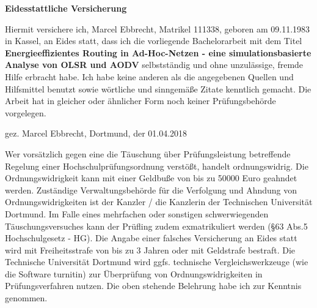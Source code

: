 
\cleardoublepage


\newpage
\noindent\large{\textbf{Eidesstattliche Versicherung}}\newline

\noindent Hiermit versichere ich, Marcel Ebbrecht, Matrikel 111338, geboren am 09.11.1983 in Kassel, an Eides statt, dass ich die vorliegende Bachelorarbeit mit dem Titel \textbf{\glqq Energieeffizientes Routing in Ad-Hoc-Netzen - eine simulationsbasierte Analyse von OLSR und AODV\grqq}  selbstständig und ohne unzulässige, fremde Hilfe erbracht habe. Ich habe keine anderen als die angegebenen Quellen und Hilfsmittel benutzt sowie wörtliche und sinngemäße Zitate kenntlich gemacht. Die Arbeit hat in gleicher oder ähnlicher Form noch keiner Prüfungsbehörde vorgelegen. \newline\newline\newline

\noindent gez. Marcel Ebbrecht, Dortmund, der 01.04.2018\newline\newline\newline

\newline\newline

\noindent Wer vorsätzlich gegen eine die Täuschung über Prüfungsleistung betreffende Regelung einer Hochschulprüfungsordnung verstößt, handelt ordnungswidrig. Die Ordnungswidrigkeit kann mit einer Geldbuße von bis zu 50000 Euro geahndet werden. Zuständige Verwaltungsbehörde für die Verfolgung und Ahndung von Ordnungswidrigkeiten ist der Kanzler / die Kanzlerin der Technischen Universität Dortmund. Im Falle eines mehrfachen oder sonstigen schwerwiegenden Täuschungsversuches kann der Prüfling zudem exmatrikuliert werden (§63 Abs.5 Hochschulgesetz - HG). Die Angabe einer falsches Versicherung an Eides statt wird mit Freiheitsstrafe von bis zu 3 Jahren oder mit Geldstrafe bestraft. Die Technische Universität Dortmund wird ggfs. technische Vergleichswerkzeuge (wie \zB die Software \glqq turnitin\grqq) zur Überprüfung von Ordnungswidrigkeiten in Prüfungsverfahren nutzen. Die oben stehende Belehrung habe ich zur Kenntnis genommen.\newline\newline\newline

